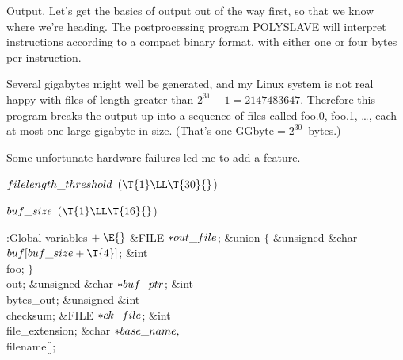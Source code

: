 Output. Let's get the basics of output out of the way
first, so that
we know where we're heading. The postprocessing program {\mc POLYSLAVE}
will interpret instructions according to a compact binary format,
with either one or four bytes per instruction.

Several gigabytes might well be generated,
and my Linux system is not real happy with files of length greater than
$2^{31}-1=2147483647$. Therefore this program breaks the output up
into a sequence of files called \.{foo.0}, \.{foo.1}, \dots, each
at most one large gigabyte in size. (That's one GGbyte${}=2^{30}$~bytes.)

Some unfortunate hardware failures led me to add a  feature.

\Y\B\4\D$\\{filelength\_threshold}$ \5
$(\T{1}\LL\T{30}{}$)\par
\B\4\D$\\{buf\_size}$ \5
$(\T{1}\LL\T{16}{}$)\par
\Y\B\4:Global variables\X${}\mathrel+\E{}$\6
\&{FILE} ${}{*}\\{out\_file}{}$;\6
\&{union} ${}\{{}$\1\6
\&{unsigned} \&{char} ${}\\{buf}[\\{buf\_size}+\T{4}]{}$;\6
\&{int} \\{foo};\2\6
${}\}{}$ \\{out};\6
\&{unsigned} \&{char} ${}{*}\\{buf\_ptr}{}$;\6
\&{int} \\{bytes\_out};\6
\&{unsigned} \&{int} \\{checksum};\6
\&{FILE} ${}{*}\\{ck\_file}{}$;\6
\&{int} \\{file\_extension};\6
\&{char} ${}{*}\\{base\_name},{}$ \\{filename}[];\par
\fi

